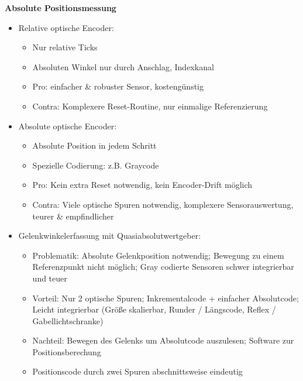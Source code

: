\textbf{Absolute Positionsmessung}
\begin{itemize}
\setlength\itemsep{0em}
\item Relative optische Encoder:
\begin{itemize}
\setlength\itemsep{0em}
\item Nur relative Ticks
\item Absoluten Winkel nur durch Anschlag, Indexkanal
\item Pro: einfacher \& robuster Sensor, kostengünstig
\item Contra: Komplexere Reset-Routine, nur einmalige Referenzierung
\end{itemize}
\item Absolute optische Encoder: 
\begin{itemize}
\setlength\itemsep{0em}
\item Absolute Position in jedem Schritt
\item Spezielle Codierung: z.B. Graycode
\item Pro: Kein extra Reset notwendig, kein Encoder-Drift möglich
\item Contra: Viele optische Spuren notwendig, komplexere Sensorauswertung, teurer \& empfindlicher
\end{itemize}
\item Gelenkwinkelerfassung mit Quasiabsolutwertgeber:
\begin{itemize}
\setlength\itemsep{0em}
\item Problematik: Absolute Gelenkposition notwendig; Bewegung zu einem Referenzpunkt nicht möglich; Gray codierte Sensoren schwer integrierbar und teuer
\item Vorteil: Nur 2 optische Spuren; Inkrementalcode + einfacher Absolutcode; Leicht integrierbar (Größe skalierbar, Runder / Längscode, Reflex / Gabellichtschranke)
\item Nachteil: Bewegen des Gelenks um Absolutcode auszulesen; Software zur Positionsberechung
\item Positionscode durch zwei Spuren abschnittsweise eindeutig
\end{itemize}
\end{itemize}

